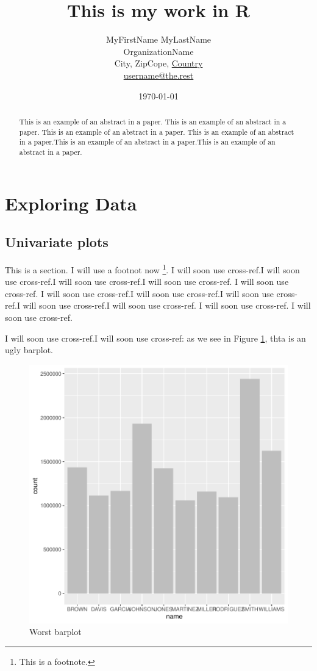 \documentclass[a4paper, 12pt]{article}
\title{This is my work in R}
\author{ MyFirstName MyLastName\\OrganizationName\\
         City, ZipCope, \underline{Country}\\
        \url{username@the.rest}}
\date{\today}  %
\begin{document}


\maketitle 
\begin{abstract}
This is an example of an abstract in a paper. This is an example of an abstract in a paper. This is an example of an abstract in a paper. This is an example of an abstract in a paper.This is an example of an abstract in a paper.This is an example of an abstract in a paper.
\end{abstract}

\newpage

\section{Exploring Data}\label{explo-data} %

\subsection{Univariate plots}
This is a section. I will use a footnot now \footnote{This is a footnote.}. I will soon use cross-ref.I will soon use cross-ref.I will soon use cross-ref.I will soon use cross-ref. I will soon use cross-ref. I will soon use cross-ref.I will soon use cross-ref.I will soon use cross-ref.I will soon use cross-ref.I will soon use cross-ref. I will soon use cross-ref. I will soon use cross-ref.


I will soon use cross-ref.I will soon use cross-ref: as we see in Figure \ref{fig:theDeli_1}, thta is an ugly barplot.

\begin{figure}[h]
\centering
\includegraphics{draft_paper_v2-theDeli_1}
\caption{Worst barplot}  %
\label{fig:theDeli_1} %
\end{figure}
\end{document}
